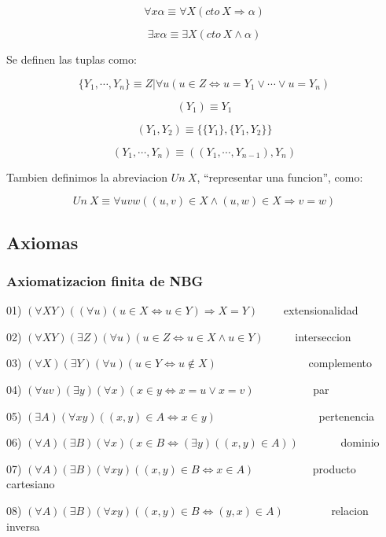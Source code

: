 \documentclass[12pt]{article}
\begin{document}
$$\forall x \alpha \equiv \forall X (cto\ X \Rightarrow \alpha)$$

$$\exists x \alpha \equiv \exists X (cto\ X \wedge \alpha)$$

Se definen las tuplas como:

$$\{Y_1, \cdots, Y_n \} \equiv Z | \forall u (u \in Z \Leftrightarrow u = Y_1 \vee \cdots \vee u = Y_n )$$

$$(Y_1) \equiv Y_1$$

$$(Y_1, Y_2) \equiv \{ \{ Y_1 \}, \{Y_1,Y_2 \} \}$$

$$(Y_1, \cdots ,Y_n) \equiv ((Y_1, \cdots , Y_{n-1}), Y_n)$$

Tambien definimos la abreviacion $Un \ X$, ``representar una funcion'', como:

$$Un \ X \equiv \forall uvw( (u,v) \in X \wedge (u,w) \in X \Rightarrow v = w)$$

\subsection{Axiomas}

\subsubsection{Axiomatizacion finita de NBG}

01) $(\forall XY)((\forall u)(u \in X \Leftrightarrow u \in Y) \Rightarrow X = Y)$ \ \ \ \ extensionalidad

02) $(\forall XY) (\exists Z) (\forall u)(u \in Z \Leftrightarrow u \in X \wedge u \in Y)$ \ \ \ \ \ interseccion

03) $(\forall X) (\exists Y) (\forall u) (u \in Y \Leftrightarrow u \notin X)$ \ \ \ \ \ \ \ \ \ \ \ \ \ \ \ \ complemento

04) $(\forall uv) (\exists y) (\forall x) (x \in y \Leftrightarrow x = u \vee x = v)$ \ \ \ \ \ \ \ \ \ \ par

05) $(\exists A) (\forall xy) ((x,y) \in A \Leftrightarrow x \in y)$ \ \ \ \ \ \ \ \ \ \ \ \ \ \ \ \ \ \ pertenencia

06) $(\forall A) (\exists B) (\forall x) (x \in B \Leftrightarrow (\exists y)( (x,y) \in A))$ \ \ \ \ \ \ \ dominio

07) $(\forall A) (\exists B) (\forall xy) ((x,y) \in B \Leftrightarrow x \in A)$ \ \ \ \ \ \ \ \ \ \ producto cartesiano

08) $(\forall A) (\exists B) (\forall xy) ((x,y) \in B \Leftrightarrow (y,x) \in A)$ \ \ \ \ \ \ \ \ relacion inversa
\end{document}
